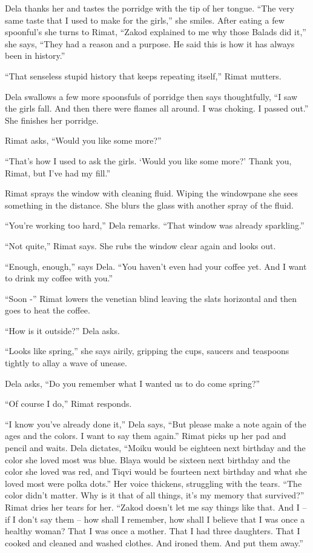 \documentclass[twoside,11pt]{book}
\begin{document}
Dela thanks her and tastes the porridge with the tip of her tongue. ``The very same taste that I used to
make for the girls,'' she smiles. After eating a few spoonful's she turns to Rimat, ``Zakod
explained to me why those Balads did it,'' she says, ``They had a reason and a purpose. He said this is how it has
always been in history.''

``That senseless stupid history that keeps repeating itself,'' Rimat mutters.

Dela swallows a few more spoonsfuls of porridge then says thoughtfully, ``I saw the girls fall. And then
there were flames all around. I was choking. I passed out.'' She finishes her porridge.

Rimat asks, ``Would you like some more?''

``That's how I used to ask the girls. `Would you like some more?' Thank you, Rimat, but I've had my
fill.''

Rimat sprays the window with cleaning fluid. Wiping the windowpane she sees something in the distance.
She blurs the glass with another spray of the fluid.

``You're working too hard,'' Dela remarks. ``That window was already
sparkling.''

``Not quite,'' Rimat says. She rubs the window clear again and looks out.

``Enough, enough,'' says Dela. ``You haven't even had your coffee yet.
And I want to drink my coffee with you.''

``Soon -'' Rimat lowers the venetian blind leaving the slats horizontal and then goes to heat
the coffee.

``How is it outside?'' Dela asks.

``Looks like spring,'' she says airily, gripping the cups, saucers and teaspoons tightly to
allay a wave of unease.

Dela asks, ``Do you remember what I wanted us to do come spring?''

``Of course I do,'' Rimat responds.

``I know you've already done it,'' Dela says, ``But please make a note again of the ages and the colors.  I
want to say them again.'' Rimat picks up her pad and pencil and waits. Dela dictates, ``Moiku
would be eighteen next birthday and the color she loved most was blue. Blaya would be sixteen next birthday and the
color she loved was red, and Tiqvi would be fourteen next birthday and what she loved most were polka
dots.'' Her voice thickens, struggling with the tears. ``The color didn't matter. Why is it
that of all things, it's my memory that survived?'' Rimat dries her tears for her. ``Zakod
doesn't let me say things like that. And I -- if I don't say them -- how shall I remember, how shall I believe that I
was once a healthy woman? That I was once a mother. That I had three daughters. That I cooked and cleaned and washed
clothes. And ironed them. And put them away.''
\end{document}
